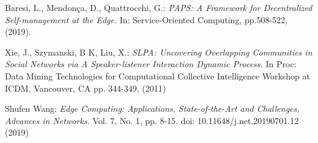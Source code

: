 \begin{thebibliography}{9}
        Baresi, L., Mendonça, D., Quattrocchi, G.: 
        \textit{PAPS: A Framework for Decentralized Self-management at the Edge.}
        In: Service-Oriented Computing, pp.508-522, (2019).   

        Xie, J., Szymanski, B K, Liu, X.:
        \textit{SLPA: Uncovering Overlapping Communities in Social Networks via
        A Speaker-listener Interaction Dynamic Process.}
        In Proc: Data Mining Technologies for Computational Collective 
        Intelligence Workshop at ICDM, Vancouver, CA pp. 344-349, (2011)

        Shufen Wang:
        \textit{Edge Computing: Applications, State-of-the-Art and Challenges, Advances in Networks.}
        Vol. 7, No. 1, pp. 8-15. doi: 10.11648/j.net.20190701.12 (2019)

\end{thebibliography}